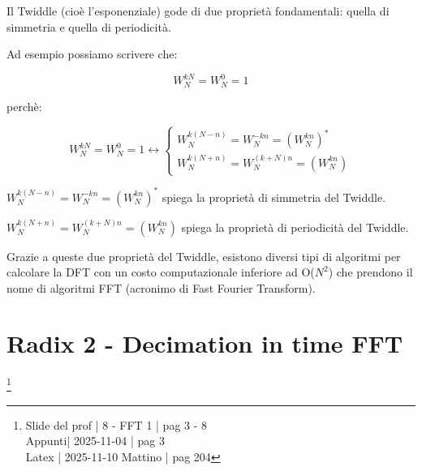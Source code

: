 \newpage 

Il Twiddle (cioè l'esponenziale) gode di due proprietà fondamentali: quella di simmetria e quella di periodicità. \newline 

Ad esempio possiamo scrivere che: 

{
    \Large 
    \begin{equation}
        W_{N}^{kN}
        = 
        W_{N}^{0}
        = 
        1
    \end{equation}
}


perchè: 


{
    \Large 
    \begin{equation} \label{eq: simmetria e periodicità del Twiddle}
        W_{N}^{kN}
        = 
        W_{N}^{0}
        = 
        1
        \leftrightarrow
        \begin{cases}
            W_{N}^{k \left(N - n\right)} 
            = 
            W_{N}^{- k  n} 
            = 
            \left( W_{N}^{k  n}  \right)^{*}
            \\
            W_{N}^{k \left(N + n\right)} 
            = 
            W_{N}^{\left(k + N\right)  n} 
            = 
            \left( W_{N}^{k  n}  \right)
        \end{cases}
    \end{equation}
}

$W_{N}^{k \left(N - n\right)} = W_{N}^{- k  n} = \left( W_{N}^{k  n}  \right)^{*}$ spiega la proprietà di simmetria del Twiddle. \newline

$W_{N}^{k \left(N + n\right)} = W_{N}^{\left(k + N\right)  n} = \left( W_{N}^{k  n}  \right)$ spiega la proprietà di periodicità del Twiddle. \newline 

Grazie a queste due proprietà del Twiddle, esistono diversi tipi di algoritmi per calcolare la DFT con un costo computazionale inferiore ad O($N^{2}$) che prendono il nome di algoritmi FFT (acronimo di Fast Fourier Transform). \newline 

\newpage 

\section{Radix 2 - Decimation in time FFT}

\footnote{ 
    Slide del prof | 8 - FFT 1 | pag 3 - 8 \\
    Appunti| 2025-11-04 | pag  3 \\ 
    Latex | 2025-11-10 Mattino | pag 204  
} 

